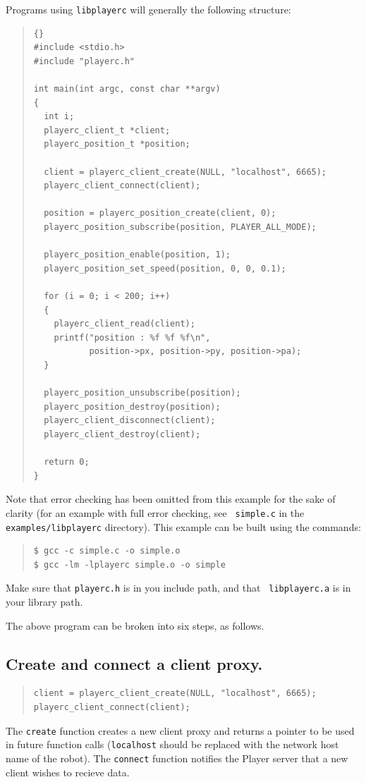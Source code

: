 \documentclass[11pt]{report}
\def\libplayerc {{\tt libplayerc} }
\begin{document}
Programs using \libplayerc will generally the following structure:
\begin{quote}
\begin{lstlisting}[frame=tb]{}
#include <stdio.h>
#include "playerc.h"

int main(int argc, const char **argv)
{
  int i;
  playerc_client_t *client;
  playerc_position_t *position;

  client = playerc_client_create(NULL, "localhost", 6665);
  playerc_client_connect(client);

  position = playerc_position_create(client, 0);
  playerc_position_subscribe(position, PLAYER_ALL_MODE);

  playerc_position_enable(position, 1);
  playerc_position_set_speed(position, 0, 0, 0.1);
  
  for (i = 0; i < 200; i++)
  {
    playerc_client_read(client);
    printf("position : %f %f %f\n",
           position->px, position->py, position->pa);
  } 

  playerc_position_unsubscribe(position);
  playerc_position_destroy(position);
  playerc_client_disconnect(client);
  playerc_client_destroy(client);

  return 0;
}
\end{lstlisting}
\end{quote}
Note that error checking has been omitted from this example for the
sake of clarity (for an example with full error checking, see {\tt
simple.c} in the {\tt examples/libplayerc} directory).  This example
can be built using the commands:
\begin{quote}
\begin{verbatim}
$ gcc -c simple.c -o simple.o
$ gcc -lm -lplayerc simple.o -o simple
\end{verbatim}
\end{quote}
Make sure that {\tt playerc.h} is in you include path, and that {\tt
libplayerc.a} is in your library path.

The above program can be broken into six steps, as follows.

\subsection*{Create and connect a client proxy.}

\begin{quote}\begin{verbatim}
client = playerc_client_create(NULL, "localhost", 6665);
playerc_client_connect(client);
\end{verbatim}\end{quote}
The {\tt create} function creates a new client proxy and returns a
pointer to be used in future function calls ({\tt localhost} should be
replaced with the network host name of the robot).  The {\tt connect}
function notifies the Player server that a new client wishes to
recieve data.
\end{document}
